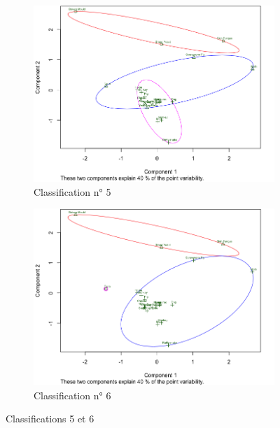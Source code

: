 \documentclass[a4paper,10pt]{report}
\begin{document}
\begin{figure}[H]
	\centering
	\captionsetup{justification=centering, margin=2cm}
	\begin{subfigure}[b]{0.5\linewidth}
		\centering
		\captionsetup{justification=centering}
		\includegraphics[width=1\linewidth]{img/3-3-mut-K-means-class-5}
		\caption{\small Classification n° 5}
		\label{fig:3-3-mut-K-means-class-5}
	\end{subfigure}%
	\begin{subfigure}[b]{0.5\linewidth}
		\centering
		\captionsetup{justification=centering}
		\includegraphics[width=1\linewidth]{img/3-3-mut-K-means-class-6}
		\caption{\small Classification n° 6}
		\label{fig:3-3-mut-K-means-class-6}
	\end{subfigure}%
	\caption{\small Classifications 5 et 6}
\end{figure}
\end{document}
